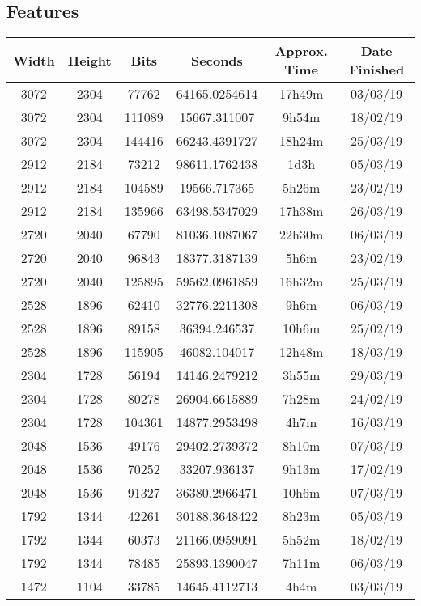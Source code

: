 \subsection{Features}
  \begin{center}
  \begin{tabular}{ c c c | c c c }
  Width & Height & Bits & Seconds & Approx. Time & Date Finished \\ \hline
  3072 & 2304 & 77762 & 64165.0254614 & 17h49m & 03/03/19 \\
  3072 & 2304 & 111089 & 15667.311007 & 9h54m & 18/02/19 \\
  3072 & 2304 & 144416 & 66243.4391727 & 18h24m & 25/03/19 \\
  2912 & 2184 & 73212 & 98611.1762438 & 1d3h & 05/03/19 \\
  2912 & 2184 & 104589 & 19566.717365 & 5h26m & 23/02/19 \\
  2912 & 2184 & 135966 & 63498.5347029 & 17h38m & 26/03/19 \\
  2720 & 2040 & 67790 & 81036.1087067 & 22h30m & 06/03/19 \\
  2720 & 2040 & 96843 & 18377.3187139 & 5h6m & 23/02/19 \\
  2720 & 2040 & 125895 & 59562.0961859 & 16h32m & 25/03/19 \\
  2528 & 1896 & 62410 & 32776.2211308 & 9h6m & 06/03/19 \\
  2528 & 1896 & 89158 & 36394.246537 & 10h6m & 25/02/19 \\
  2528 & 1896 & 115905 & 46082.104017 & 12h48m & 18/03/19 \\
  2304 & 1728 & 56194 & 14146.2479212 & 3h55m & 29/03/19 \\
  2304 & 1728 & 80278 & 26904.6615889 & 7h28m & 24/02/19 \\
  2304 & 1728 & 104361 & 14877.2953498 & 4h7m & 16/03/19 \\
  2048 & 1536 & 49176 & 29402.2739372 & 8h10m & 07/03/19 \\
  2048 & 1536 & 70252 & 33207.936137 & 9h13m & 17/02/19 \\
  2048 & 1536 & 91327 & 36380.2966471 & 10h6m & 07/03/19 \\
  1792 & 1344 & 42261 & 30188.3648422 & 8h23m & 05/03/19 \\
  1792 & 1344 & 60373 & 21166.0959091 & 5h52m & 18/02/19 \\
  1792 & 1344 & 78485 & 25893.1390047 & 7h11m & 06/03/19 \\
  1472 & 1104 & 33785 & 14645.4112713 & 4h4m & 03/03/19 \\

\end{tabular}
\end{center}
